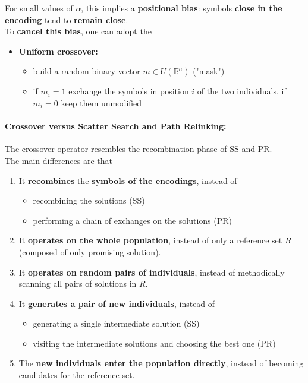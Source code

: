 \documentclass[11pt]{article}
\begin{document}
	For small values of $\alpha$, this implies a \textbf{positional bias}: symbols \textbf{close in the encoding} tend to \textbf{remain close}. \\
	To \textbf{cancel this bias}, one can adopt the
	\begin{itemize}
		\item \textbf{Uniform crossover:}
		\begin{itemize}
			\item build a random binary vector $m \in U(\mathbb{B}^n)$ ("mask")
			\item if $m_i = 1$ exchange the symbols in position $i$ of the two individuals, if $m_i = 0$ keep them unmodified
		\end{itemize}
	\end{itemize}
	
	\newpage
	
	\paragraph{Crossover versus Scatter Search and Path Relinking:} The crossover operator resembles the recombination phase of SS and PR.\\
	
	The main differences are that
	\begin{enumerate}
		\item It \textbf{recombines} the \textbf{symbols of the encodings}, instead of
		\begin{itemize}
			\item recombining the solutions (SS)
			\item performing a chain of exchanges on the solutions (PR)
		\end{itemize}
		\nn
		
		\item It \textbf{operates on the whole population}, instead of only a reference set $R$ (composed of only promising solution).\\
		
		\item It \textbf{operates on random pairs of individuals}, instead of methodically scanning all pairs of solutions in $R$.\\
		
		\item It \textbf{generates a pair of new individuals}, instead of
		\begin{itemize}
			\item generating a single intermediate solution (SS)
			\item visiting the intermediate solutions and choosing the best one (PR)
		\end{itemize}
		
		\item The \textbf{new individuals enter the population directly}, instead of becoming candidates for the reference set.\\
	\end{enumerate}
	
\end{document}
